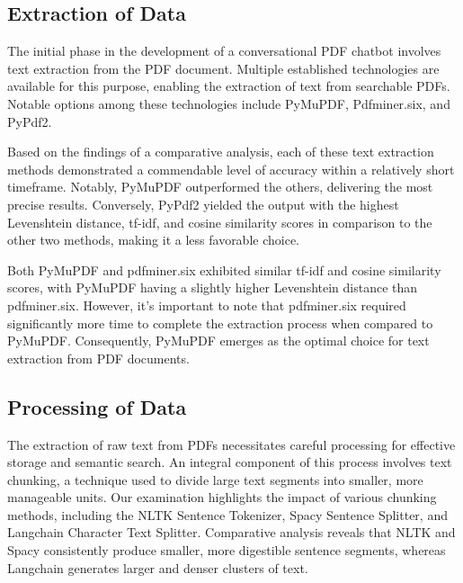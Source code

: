 \documentclass[conference]{IEEEtran}
\begin{document}
\subsection{Extraction of Data}

The initial phase in the development of a conversational PDF chatbot involves text extraction from the PDF document. Multiple established technologies are available for this purpose, enabling the extraction of text from searchable PDFs. Notable options among these technologies include PyMuPDF, Pdfminer.six, and PyPdf2.

Based on the findings of a comparative analysis, each of these text extraction methods demonstrated a commendable level of accuracy within a relatively short timeframe. Notably, PyMuPDF outperformed the others, delivering the most precise results. Conversely, PyPdf2 yielded the output with the highest Levenshtein distance, tf-idf, and cosine similarity scores in comparison to the other two methods, making it a less favorable choice.

Both PyMuPDF and pdfminer.six exhibited similar tf-idf and cosine similarity scores, with PyMuPDF having a slightly higher Levenshtein distance than pdfminer.six. However, it's important to note that pdfminer.six required significantly more time to complete the extraction process when compared to PyMuPDF. Consequently, PyMuPDF emerges as the optimal choice for text extraction from PDF documents.


\subsection{Processing of Data}

The extraction of raw text from PDFs necessitates careful processing for effective storage and semantic search. An integral component of this process involves text chunking, a technique used to divide large text segments into smaller, more manageable units. Our examination highlights the impact of various chunking methods, including the NLTK Sentence Tokenizer, Spacy Sentence Splitter, and Langchain Character Text Splitter. Comparative analysis reveals that NLTK and Spacy consistently produce smaller, more digestible sentence segments, whereas Langchain generates larger and denser clusters of text.
\end{document}
